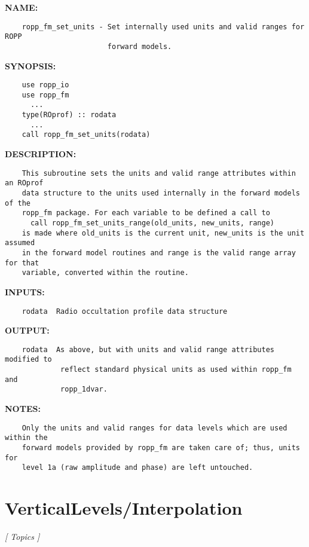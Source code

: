 \label{ch:robo91}
\label{ch:Units_ropp_fm_set_units}
\textbf{NAME:}\hspace{0.08in}\begin{Verbatim}
    ropp_fm_set_units - Set internally used units and valid ranges for ROPP
                        forward models.
\end{Verbatim}
\textbf{SYNOPSIS:}\hspace{0.08in}\begin{Verbatim}
    use ropp_io
    use ropp_fm
      ...
    type(ROprof) :: rodata
      ...
    call ropp_fm_set_units(rodata)
\end{Verbatim}
\textbf{DESCRIPTION:}\hspace{0.08in}\begin{Verbatim}
    This subroutine sets the units and valid range attributes within an ROprof
    data structure to the units used internally in the forward models of the
    ropp_fm package. For each variable to be defined a call to
      call ropp_fm_set_units_range(old_units, new_units, range)
    is made where old_units is the current unit, new_units is the unit assumed
    in the forward model routines and range is the valid range array for that
    variable, converted within the routine.
\end{Verbatim}
\textbf{INPUTS:}\hspace{0.08in}\begin{Verbatim}
    rodata  Radio occultation profile data structure
\end{Verbatim}
\textbf{OUTPUT:}\hspace{0.08in}\begin{Verbatim}
    rodata  As above, but with units and valid range attributes modified to
             reflect standard physical units as used within ropp_fm and
             ropp_1dvar.
\end{Verbatim}
\textbf{NOTES:}\hspace{0.08in}\begin{Verbatim}
    Only the units and valid ranges for data levels which are used within the
    forward models provided by ropp_fm are taken care of; thus, units for
    level 1a (raw amplitude and phase) are left untouched.
\end{Verbatim}
\section{VerticalLevels/Interpolation}
\textsl{[ Topics ]}

